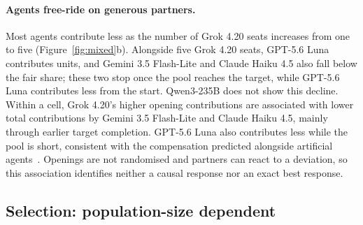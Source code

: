 \documentclass[sigconf,anonymous]{aamas}
\begin{document}
\paragraph{Agents free-ride on generous partners.}
Most agents contribute less as the number of Grok 4.20 seats increases from one to five (Figure~\ref{fig:mixed}b). Alongside five Grok 4.20 seats,  GPT-5.6 Luna contributes  \MixLunaBesideFiveGrok{} units, and Gemini 3.5 Flash-Lite and Claude Haiku 4.5 also fall below the fair share; these two stop once the pool reaches the target, while GPT-5.6 Luna contributes  less from the start. Qwen3-235B does not show this decline. Within a cell, Grok 4.20's higher opening contributions are associated with lower total contributions by Gemini 3.5 Flash-Lite and Claude Haiku 4.5, mainly through earlier target completion. GPT-5.6 Luna also contributes  less while the pool is short, consistent with the compensation predicted alongside artificial agents~\cite{terrucha2024art}. Openings are not randomised and partners can react to a deviation, so this association identifies neither a causal response nor an exact best response.


\subsection{Selection: population-size dependent }
\label{sec:selection}
\end{document}
